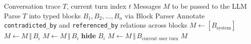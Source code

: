 \documentclass{article}
\begin{document}
\begin{algorithm}[h]
\caption{\textsc{CacheGuard} renderer (called before every assistant turn)}
\label{alg:cacheguard}
\begin{algorithmic}[1]
\Require Conversation trace $T$, current turn index $t$
\Ensure Messages $M$ to be passed to the LLM
\State Parse $T$ into typed blocks $B_1, B_2, \ldots, B_n$ via Block Parser
\State Annotate \texttt{contradicted\_by} and \texttt{referenced\_by} relations across blocks
\State $M \gets [B_{\text{system}}]$
    \State $M \gets M \,\Vert\, B_i$
    \State $M \gets M \,\Vert\, B_i$
  \Else
    \State \textbf{hide} $B_i$ 
  \EndIf
\EndFor
\State $M \gets M \,\Vert\, B_{\text{current user turn}}$
\State \Return $M$
\end{algorithmic}
\end{algorithm}
\end{document}

